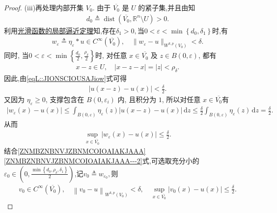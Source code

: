 \documentclass[../../main.tex]{subfiles}
\begin{document}
\begin{proof}
(iii)再处理内部开集 $V_0$. 
由于 $\overline{V_0}$ 是 $U$ 的紧子集,并且由知
\begin{align*}
d_0\triangleq
\operatorname{dist}(\overline{V_0},\mathbb{R}^{n}\setminus U)>0.
\end{align*}
利用\hyperref[theorem:ch05-光滑函数的局部逼近定理]{光滑函数的局部逼近定理}知,存在$\delta_1>0,$当$0<\varepsilon<
\min\left\{d_0,\delta_1\right\}$时,有
\begin{align}\label{ZNMBZNBNVJZBNMCOIOAIAKJAAA}
w_\varepsilon\triangleq \eta_\varepsilon * u\in C^\infty(\overline{V_0}),\quad \|w_\varepsilon-u\|_{W^{k,p}(V_0)}<\delta .
\end{align}
同时, 当$0<\varepsilon<
\min\left\{\frac{d_0}{2},\frac{\rho_\delta}{2}\right\}$时, 对任意 $x\in\overline{V_0}$ 及 $z\in B(0,\varepsilon)$, 都有
\begin{align*}
x-z\in U,\quad
|x-z-x|=|z|<\rho_\delta.
\end{align*}
因此,由\eqref{eqL::JIONSCIOUSAJiow}式可得
\begin{align*}
|u(x-z)-u(x)|<\frac{\delta}{2}.
\end{align*}
又因为 $\eta_{\varepsilon}\geqslant0$, 支撑包含在 $B(0,\varepsilon_i)$ 内, 且积分为 $1$, 所以对任意 $x\in\overline{V_0}$有
\begin{align*}
|w_\varepsilon(x)-u(x)|
\leqslant
\int_{B(0,\varepsilon)}
\eta_\varepsilon(z)|u(x-z)-u(x)|\,\mathrm{d}z
\leqslant
\frac{\delta}{2}
\int_{B(0,\varepsilon)}
\eta_\varepsilon(z)\,\mathrm{d}z
=\frac{\delta}{2}.
\end{align*}
从而
\begin{align}\label{ZNMBZNBNVJZBNMCOIOAIAKJAAA---2}
\sup\limits_{x\in\overline{V_0}}
|w_\varepsilon(x)-u(x)|
\leqslant\frac{\delta}{2}.
\end{align}
结合\eqref{ZNMBZNBNVJZBNMCOIOAIAKJAAA}\eqref{ZNMBZNBNVJZBNMCOIOAIAKJAAA---2}式,可选取充分小的$\varepsilon _0\in \left( 0,\frac{\min \left\{ d_0,\rho _{\delta},\delta _1 \right\}}{2} \right)$,记$v_0\triangleq w_{\varepsilon_0},$则
\begin{align}\label{124233534634536345}
v_0\in C^{\infty}(\overline{V_0}),\quad \left\| v_0-u \right\| _{W^{k,p}(V_0)}<\delta ,\quad \mathop {\mathrm{sup}} \limits_{x\in \overline{V_0}}|v_0(x)-u(x)|\leqslant \frac{\delta}{2}.
\end{align}


\end{proof}
\end{document}
